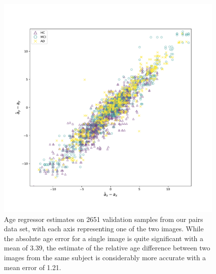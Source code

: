 \begin{figure}
	\centering
	\includegraphics[width=.9\linewidth]{images/age_plots/xr_yr_dx} 
	\vspace*{-15pt}
	\caption{Age regressor estimates on 2651 validation samples from our pairs data set, with each axis representing one of the two images. While the absolute age error for a single image is quite significant with a mean of 3.39, the estimate of the relative age difference between two images from the same subject is considerably more accurate with a mean error of 1.21.}
	\label{fig:regxryr}
\end{figure}

